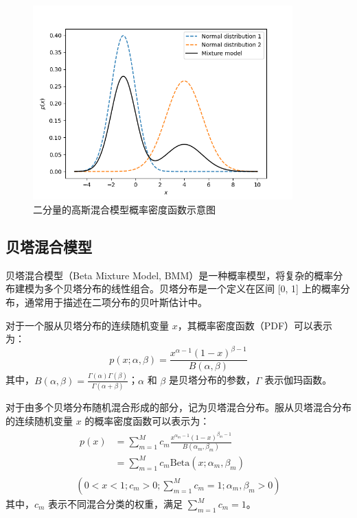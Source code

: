 \begin{figure}[ht!]
    \centering
    \includegraphics[width=10cm]{pic/chapter4/GMM.png}
    \caption{二分量的高斯混合模型概率密度函数示意图}
    \label{GMM}
\end{figure}

\subsection{贝塔混合模型}
贝塔混合模型（Beta Mixture Model, BMM）是一种概率模型，将复杂的概率分布建模为多个贝塔分布的线性组合。贝塔分布是一个定义在区间 [0, 1] 上的概率分布，通常用于描述在二项分布的贝叶斯估计中。

对于一个服从贝塔分布的连续随机变量 $x$，其概率密度函数（PDF）可以表示为：
\begin{equation}
    \label{eq:beta1}
    p(x; \alpha, \beta) = \frac{x^{\alpha - 1} (1 - x)^{\beta - 1}}{B(\alpha, \beta)}
\end{equation}
其中，$B(\alpha, \beta) = \frac{\Gamma(\alpha) \Gamma(\beta)}{\Gamma(\alpha + \beta)}$；$\alpha$ 和 $\beta$ 是贝塔分布的参数，$\Gamma$ 表示伽玛函数。

对于由多个贝塔分布随机混合形成的部分，记为贝塔混合分布。服从贝塔混合分布的连续随机变量 $x$ 的概率密度函数可以表示为：
\begin{equation}
    \label{eq:beta}
    \begin{gathered}
        \begin{aligned}
            p(x) & = \sum_{m=1}^M c_m \frac{x^{\alpha_m - 1} (1 - x)^{\beta_m - 1}}{B(\alpha_m, \beta_m)} \\
                 & = \sum_{m=1}^M c_m \text{Beta}(x; \alpha_m, \beta_m)
        \end{aligned}
        \\
        (0 < x < 1; c_m > 0; \sum_{m=1}^M c_m = 1; \alpha_m, \beta_m > 0)
    \end{gathered}
\end{equation}
其中，$c_m$ 表示不同混合分类的权重，满足 $\sum_{m=1}^M c_m=1$。

